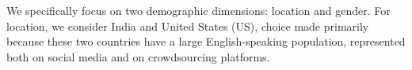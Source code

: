\documentclass[11pt,letterpaper]{article}
\begin{document}



We specifically focus on two demographic dimensions: location and gender. For location, we consider India and United States (US), choice made primarily because these two countries have a large English-speaking population, represented both on social media and on crowdsourcing platforms. %
\end{document}
